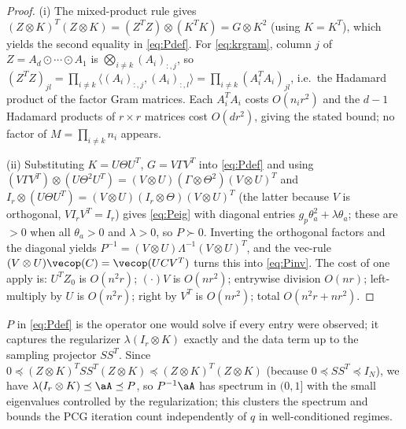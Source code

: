 \begin{proof}
(i) The mixed-product rule gives
$(Z\otimes K)^{T}(Z\otimes K)=(Z^{T}Z)\otimes(K^{T}K)=G\otimes K^{2}$ (using
$K=K^{T}$), which yields the second equality in \eqref{eq:Pdef}. For
\eqref{eq:krgram}, column $j$ of $Z=A_d\odot\cdots\odot A_1$ is
$\bigotimes_{i\neq k}(A_i)_{:,j}$, so
$(Z^{T}Z)_{jl}=\prod_{i\neq k}\langle (A_i)_{:,j},(A_i)_{:,l}\rangle
=\prod_{i\neq k}(A_i^{T}A_i)_{jl}$, i.e.\ the Hadamard product of the factor
Gram matrices. Each $A_i^{T}A_i$ costs $O(n_i r^{2})$ and the $d-1$ Hadamard
products of $r\times r$ matrices cost $O(d r^{2})$, giving the stated bound; no
factor of $M=\prod_{i\neq k}n_i$ appears.

(ii) Substituting $K=U\Theta U^{T}$, $G=V\Gamma V^{T}$ into \eqref{eq:Pdef} and
using $(V\Gamma V^{T})\otimes(U\Theta^{2}U^{T})=(V\otimes U)(\Gamma\otimes\Theta^{2})(V\otimes U)^{T}$
and $I_r\otimes(U\Theta U^{T})=(V\otimes U)(I_r\otimes\Theta)(V\otimes U)^{T}$
(the latter because $V$ is orthogonal, $V I_r V^{T}=I_r$) gives \eqref{eq:Peig}
with diagonal entries $g_p\theta_a^{2}+\lambda\theta_a$; these are $>0$ when all
$\theta_a>0$ and $\lambda>0$, so $P\succ0$. Inverting the orthogonal factors and
the diagonal yields
$P^{-1}=(V\otimes U)\Lambda^{-1}(V\otimes U)^{T}$, and the vec-rule
$(V\otimes U)\vecop(C)=\vecop(UCV^{T})$ turns this into \eqref{eq:Pinv}.
The cost of one apply is: $U^{T}Z_0$ is $O(n^{2}r)$; $(\cdot)V$ is $O(nr^{2})$;
entrywise division $O(nr)$; left-multiply by $U$ is $O(n^{2}r)$; right by
$V^{T}$ is $O(nr^{2})$; total $O(n^{2}r+nr^{2})$.
\end{proof}

\begin{remark}\label{rem:whyprecond}
$P$ in \eqref{eq:Pdef} is the operator one would solve if every entry were
observed; it captures the regularizer $\lambda(I_r\otimes K)$ exactly and the
data term up to the sampling projector $SS^{T}$. Since
$0\preceq (Z\otimes K)^{T}SS^{T}(Z\otimes K)\preceq(Z\otimes K)^{T}(Z\otimes K)$
(because $0\preceq SS^{T}\preceq I_N$), we have $\lambda(I_r\otimes
K)\preceq\aA\preceq P$, so $P^{-1}\aA$ has spectrum in $(0,1]$ with the small
eigenvalues controlled by the regularization; this clusters the spectrum and
bounds the PCG iteration count independently of $q$ in well-conditioned regimes.
\end{remark}

